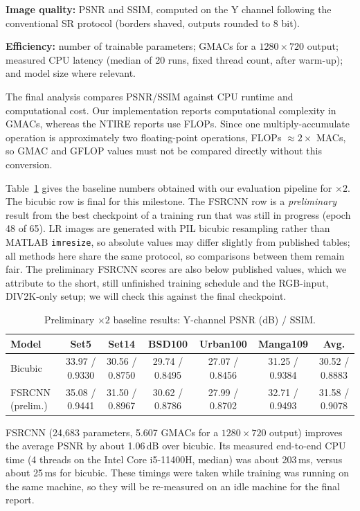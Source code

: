 \documentclass[11pt,a4paper]{article}
\begin{document}
\textbf{Image quality:} PSNR and SSIM, computed on the Y channel following
the conventional SR protocol (borders shaved, outputs rounded to 8 bit).

\textbf{Efficiency:} number of trainable parameters; GMACs for a
$1280\times720$ output; measured CPU latency (median of 20 runs, fixed
thread count, after warm-up); and model size where relevant.

The final analysis compares PSNR/SSIM against CPU runtime and computational
cost. Our implementation reports computational complexity in GMACs,
whereas the NTIRE reports use FLOPs. Since one multiply-accumulate
operation is approximately two floating-point operations, FLOPs
$\approx 2\times$ MACs, so GMAC and GFLOP values must not be compared
directly without this conversion.

Table~\ref{tab:prelim} gives the baseline numbers obtained with our
evaluation pipeline for $\times2$. The bicubic row is final for this
milestone. The FSRCNN row is a \emph{preliminary} result from the best
checkpoint of a training run that was still in progress (epoch 48 of 65).
LR images are generated with PIL bicubic resampling rather than MATLAB
\texttt{imresize}, so absolute values may differ slightly from published
tables; all methods here share the same protocol, so comparisons between
them remain fair. The preliminary FSRCNN scores are also below published
values, which we attribute to the short, still unfinished training schedule
and the RGB-input, DIV2K-only setup; we will check this against the final
checkpoint.

\begin{table}[h]
\centering
\caption{Preliminary $\times2$ baseline results: Y-channel PSNR (dB) / SSIM.}
\label{tab:prelim}
\footnotesize
\setlength{\tabcolsep}{4pt}
\begin{tabular}{@{}lcccccc@{}}
\toprule
\textbf{Model} & \textbf{Set5} & \textbf{Set14} & \textbf{BSD100} &
\textbf{Urban100} & \textbf{Manga109} & \textbf{Avg.} \\
\midrule
Bicubic & 33.97 / 0.9330 & 30.56 / 0.8750 & 29.74 / 0.8495 &
27.07 / 0.8456 & 31.25 / 0.9384 & 30.52 / 0.8883 \\
FSRCNN (prelim.) & 35.08 / 0.9441 & 31.50 / 0.8967 & 30.62 / 0.8786 &
27.99 / 0.8702 & 32.71 / 0.9493 & 31.58 / 0.9078 \\
\bottomrule
\end{tabular}
\end{table}

FSRCNN (24,683 parameters, 5.607 GMACs for a $1280\times720$ output)
improves the average PSNR by about 1.06\,dB over bicubic. Its measured
end-to-end CPU time (4 threads on the Intel Core i5-11400H, median) was about
203\,ms, versus about 25\,ms for bicubic. These timings were taken while
training was running on the same machine, so they will be re-measured on an
idle machine for the final report.
\end{document}
